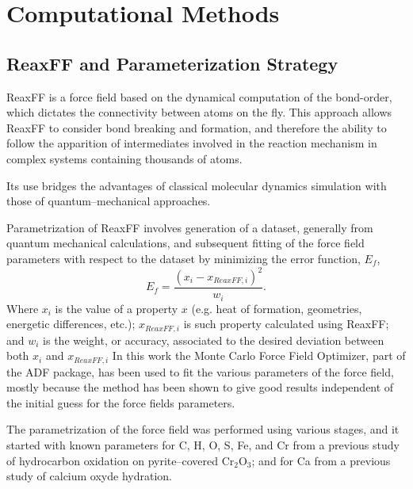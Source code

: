\documentclass[journal=jpcafh,manuscript=article]{achemso}
\begin{document}
\section{Computational Methods}

\subsection{ReaxFF and Parameterization Strategy}
\label{sec:reaxff-strategy}

ReaxFF is a force field based on the dynamical computation of the bond-order, which dictates the connectivity between atoms on the fly.
This approach allows ReaxFF to consider bond breaking and formation, and therefore the ability to follow the apparition of intermediates involved in the reaction mechanism in complex systems containing thousands of atoms.\cite{migliorati_development_2017,merinov_reaxff_2014,
raymand_reactive_2008,
shin_development_2015,
van_duin_reaxff_2008,
goddard_development_2006,
hubin_parameterization_2016,
senftle_reaxff_2016,
chenoweth_reaxff_2009,
chenoweth_reaxff_2008,
van_duin_reaxff_2008-1,
liu_reaxff-lg:_2011}

Its use bridges the advantages of classical molecular dynamics simulation with those of quantum--mechanical approaches.

Parametrization of ReaxFF involves generation of a dataset, generally from quantum mechanical calculations, and subsequent fitting of the force field parameters with respect to the dataset by minimizing the error function, $E_f$,
\begin{equation}
E_f = \frac{(x_{i} - x_{ReaxFF,i})^2}{w_i}.
\end{equation}
Where $x_{i}$ is the value of a property $x$ (e.g. heat of formation, geometries, energetic differences, etc.); $x_{ReaxFF,i}$ is such property calculated using ReaxFF; and $w_i$ is the weight, or accuracy, associated to the desired deviation between both $x_i$ and $x_{ReaxFF,i}$
In this work the Monte Carlo Force Field Optimizer,\cite{iype_parameterization_2013} part of the ADF package, has been used to fit the various parameters of the force field, mostly because the method has been shown to give good results independent of the initial guess for the force fields parameters.

The parametrization of the force field was performed using various stages, and it started with known parameters for C, H, O, S, Fe, and Cr from a previous study of hydrocarbon oxidation on pyrite--covered Cr$_2$O$_3$; \cite{shin_development_2015} and for Ca from a previous study of calcium oxyde hydration. \cite{manzano_hydration_2012}
\end{document}
